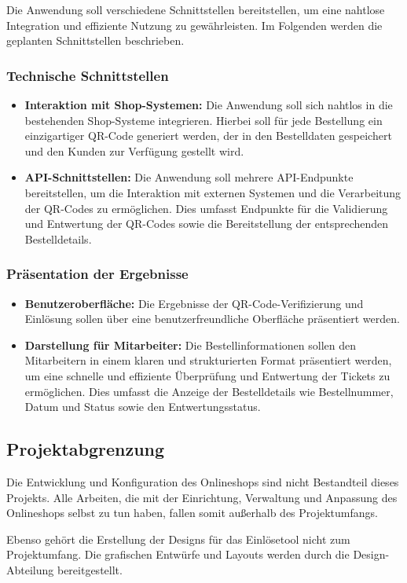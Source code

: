 Die Anwendung soll verschiedene Schnittstellen bereitstellen, um eine nahtlose Integration und effiziente Nutzung zu gewährleisten. Im Folgenden werden die geplanten Schnittstellen beschrieben.

\subsubsection{Technische Schnittstellen}

\begin{itemize}
    \item \textbf{Interaktion mit Shop-Systemen:} Die Anwendung soll sich nahtlos in die bestehenden Shop-Systeme integrieren. Hierbei soll für jede Bestellung ein einzigartiger QR-Code generiert werden, der in den Bestelldaten gespeichert und den Kunden zur Verfügung gestellt wird.
    \item \textbf{API-Schnittstellen:} Die Anwendung soll mehrere API-Endpunkte bereitstellen, um die Interaktion mit externen Systemen und die Verarbeitung der QR-Codes zu ermöglichen. Dies umfasst Endpunkte für die Validierung und Entwertung der QR-Codes sowie die Bereitstellung der entsprechenden Bestelldetails.
\end{itemize}

\subsubsection{Präsentation der Ergebnisse}

\begin{itemize}
    \item \textbf{Benutzeroberfläche:} Die Ergebnisse der QR-Code-Verifizierung und Einlösung sollen über eine benutzerfreundliche Oberfläche präsentiert werden.
    \item \textbf{Darstellung für Mitarbeiter:} Die Bestellinformationen sollen den Mitarbeitern in einem klaren und strukturierten Format präsentiert werden, um eine schnelle und effiziente Überprüfung und Entwertung der Tickets zu ermöglichen. Dies umfasst die Anzeige der Bestelldetails wie Bestellnummer, Datum und Status sowie den Entwertungsstatus.
\end{itemize}


\subsection{Projektabgrenzung} 
\label{sec:Projektabgrenzung}

Die Entwicklung und Konfiguration des Onlineshops sind nicht Bestandteil dieses Projekts. Alle Arbeiten, die mit der Einrichtung, Verwaltung und Anpassung des Onlineshops selbst zu tun haben, fallen somit außerhalb des Projektumfangs.

Ebenso gehört die Erstellung der Designs für das Einlösetool nicht zum Projektumfang. Die grafischen Entwürfe und Layouts werden durch die Design-Abteilung bereitgestellt.